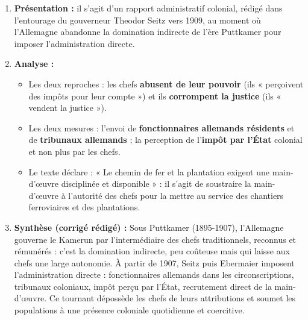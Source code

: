 \documentclass[11pt]{article}
\begin{document}
\begin{corrige}
\begin{enumerate}
    \item \textbf{Présentation :} il s'agit d'un rapport administratif colonial, rédigé dans l'entourage du gouverneur Theodor Seitz vers 1909, au moment où l'Allemagne abandonne la domination indirecte de l'ère Puttkamer pour imposer l'administration directe.
    \item \textbf{Analyse :}
    \begin{itemize}
        \item[a)] Les deux reproches : les chefs \textbf{abusent de leur pouvoir} (ils « perçoivent des impôts pour leur compte ») et ils \textbf{corrompent la justice} (ils « vendent la justice »).
        \item[b)] Les deux mesures : l'envoi de \textbf{fonctionnaires allemands résidents} et de \textbf{tribunaux allemands} ; la perception de l'\textbf{impôt par l'État} colonial et non plus par les chefs.
        \item[c)] Le texte déclare : « Le chemin de fer et la plantation exigent une main-d'œuvre disciplinée et disponible » : il s'agit de soustraire la main-d'œuvre à l'autorité des chefs pour la mettre au service des chantiers ferroviaires et des plantations.
    \end{itemize}
    \item \textbf{Synthèse (corrigé rédigé) :} Sous Puttkamer (1895-1907), l'Allemagne gouverne le Kamerun par l'intermédiaire des chefs traditionnels, reconnus et rémunérés : c'est la domination indirecte, peu coûteuse mais qui laisse aux chefs une large autonomie. À partir de 1907, Seitz puis Ebermaier imposent l'administration directe : fonctionnaires allemands dans les circonscriptions, tribunaux coloniaux, impôt perçu par l'État, recrutement direct de la main-d'œuvre. Ce tournant dépossède les chefs de leurs attributions et soumet les populations à une présence coloniale quotidienne et coercitive.


\end{enumerate}
\end{corrige}
\end{document}

